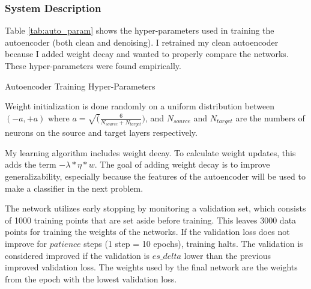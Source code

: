 \documentclass[a4paper, 12pt, titlepage]{article}
\newcommand{\tabRef}[1]{Table \ref{#1}}
\begin{document}
  \subsubsection{System Description}
  \par \tabRef{tab:auto_param} shows the hyper-parameters used in training
  the autoencoder (both clean and denoising).
  I retrained my clean autoencoder because I added weight decay and wanted to
  properly compare the networks.
  These hyper-parameters were found empirically.
  \begin{table}[htb]
    \centering
    \vspace{-12pt}
    \caption{Autoencoder Training Hyper-Parameters}
    \vspace{-12pt}
    \label{tab:auto_param}
    \vspace{-12pt}
  \end{table}
  \par Weight initialization is done randomly on a uniform distribution between
  $(-a, +a)$ where $a = \sqrt(\frac{6}{N_{source} + N_{target}})$, and
  $N_{source}$ and $N_{target}$ are the numbers of neurons on the source and
  target layers respectively.
  \par My learning algorithm includes weight decay.
  To calculate weight updates, this adds the term $-\lambda * \eta * w$.
  The goal of adding weight decay is to improve generalizability, especially
  because the features of the autoencoder will be used to make a classifier in
  the next problem.
  \par The network utilizes early stopping by monitoring a validation set,
  which consists of 1000 training points that are set aside before training.
  This leaves 3000 data points for training the weights of the networks.
  If the validation loss does not improve for $patience$ steps (1 step = 10
  epochs), training halts.
  The validation is considered improved if the validation is $es\_delta$ lower
  than the previous improved validation loss.
  The weights used by the final network are the weights from the epoch with the
  lowest validation loss.
\end{document}
